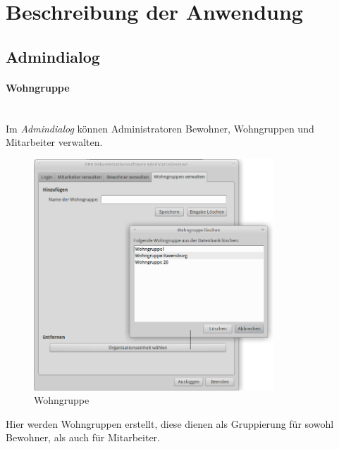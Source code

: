 \section{Beschreibung der Anwendung}
\label{sec:beschreibung}
\subsection{Admindialog}
\paragraph{Wohngruppe}\mbox{}\\
Im \textit{Admindialog} können Administratoren Bewohner, Wohngruppen und Mitarbeiter verwalten.
\begin{figure}[h]
	\begin{center}
		\includegraphics[keepaspectratio=true, width=0.8\textwidth]{pics/admin3.png}
		\caption{Wohngruppe}
	\end{center}
\end{figure}
\FloatBarrier
\noindent
Hier werden Wohngruppen erstellt, diese dienen als Gruppierung für sowohl Bewohner, als auch für Mitarbeiter.
\newpage
\noindent
